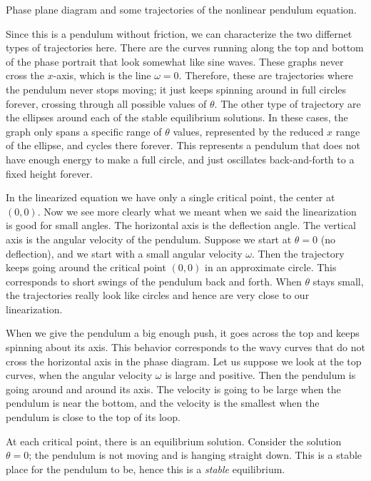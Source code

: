 \documentclass{ximera}
\begin{document}
\begin{myfig}
    \capstart
    \caption{Phase plane diagram and some trajectories of the nonlinear pendulum equation. \label{fig:nlin-pend-phasediag}}
\end{myfig}

Since this is a pendulum without friction, we can characterize the two differnet types of trajectories here. There are the curves running along the top and bottom of the phase portrait that look somewhat like sine waves. These graphs never cross the $x$-axis, which is the line $\omega = 0$. Therefore, these are trajectories where the pendulum never stops moving; it just keeps spinning around in full circles forever, crossing through all possible values of $\theta$. The other type of trajectory are the ellipses around each of the stable equilibrium solutions. In these cases, the graph only spans a specific range of $\theta$ values, represented by the reduced $x$ range of the ellipse, and cycles there forever. This represents a pendulum that does not have enough energy to make a full circle, and just oscillates back-and-forth to a fixed height forever.

In the linearized equation we have only a single critical point, the center at $(0,0)$.  Now we see more clearly what we meant when we said the linearization is good for small angles.  The horizontal axis is the deflection angle.  The vertical axis is the angular velocity of the pendulum.  Suppose we start at $\theta = 0$ (no deflection), and we start with a small angular velocity $\omega$.  Then the trajectory keeps going around the critical point $(0,0)$ in an approximate circle.  This corresponds to short swings of the pendulum back and forth.  When $\theta$ stays small, the trajectories really look like circles and hence are very close to our linearization.

When we give the pendulum a big enough push, it goes across the top and keeps spinning about its axis.  This behavior corresponds to the wavy curves that do not cross the horizontal axis in the phase diagram. Let us suppose we look at the top curves, when the angular velocity $\omega$ is large and positive.  Then the pendulum is going around and around its axis.  The velocity is going to be large when the pendulum is near the bottom, and the velocity is the smallest when the pendulum is close to the top of its loop.

At each critical point, there is an equilibrium solution.  Consider the solution $\theta = 0$;  the pendulum is not moving and is hanging straight down.  This is a stable place for the pendulum to be, hence this is a \emph{stable} equilibrium.
\end{document}
